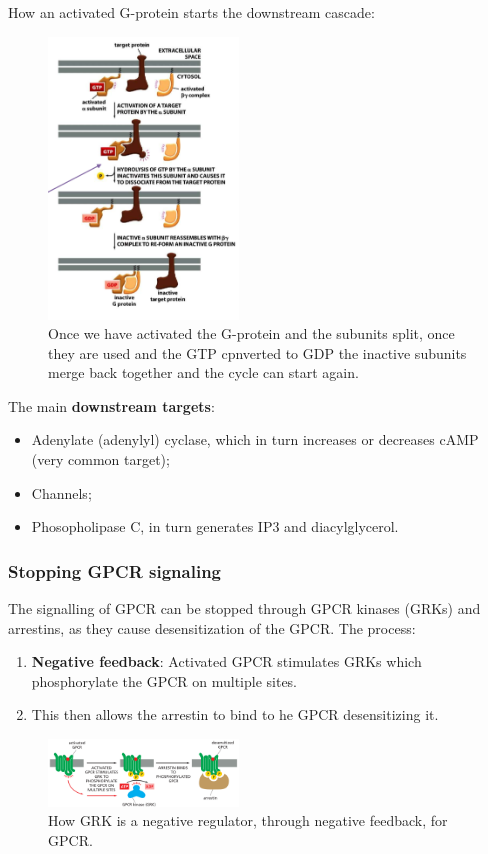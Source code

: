 \documentclass[../main.tex]{subfiles}
\begin{document}
How an activated G-protein starts the downstream cascade:
\begin{figure}[H]
	\centering
	\includegraphics[width=0.45\textwidth]{G_usage}
	\caption{Once we have activated the G-protein and the subunits split, once they are used and the GTP cpnverted to GDP the inactive subunits merge back together and the cycle can start again.}
\end{figure}

The main \textbf{downstream targets}: 
\begin{itemize}
	\item Adenylate (adenylyl) cyclase, which in turn increases or decreases cAMP (very common target);
	\item Channels;
	\item Phosopholipase C, in turn generates IP3 and diacylglycerol.
\end{itemize}

\subsubsection{Stopping GPCR signaling}

The signalling of GPCR can be stopped through GPCR kinases (GRKs) and arrestins, as they cause desensitization of the GPCR. The process:
\begin{enumerate}
	\item \textbf{Negative feedback}: Activated GPCR stimulates GRKs which phosphorylate the GPCR on multiple sites. 
	\item This then allows the arrestin to bind to he GPCR desensitizing it. 
\end{enumerate}
\begin{figure}[H]
	\centering
	\includegraphics[width=0.45\textwidth]{GRk}
	\caption{How GRK is a negative regulator, through negative feedback, for GPCR.} 
\end{figure}
\end{document}
